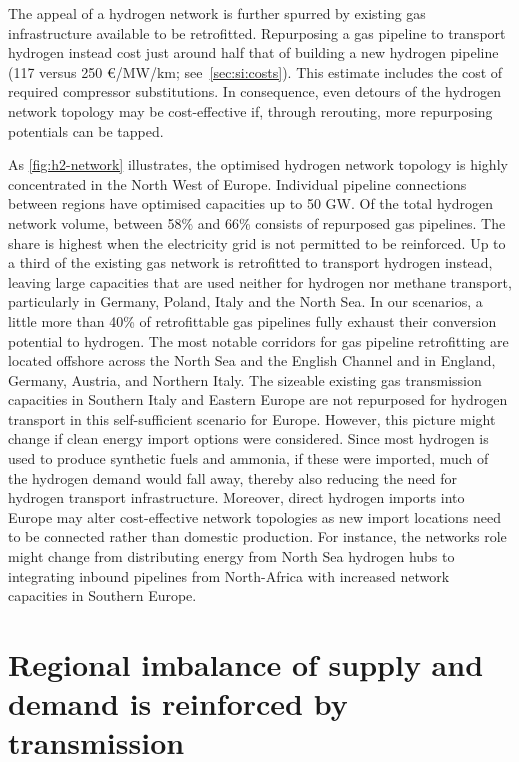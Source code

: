 The appeal of a hydrogen network is further spurred by existing gas
infrastructure available to be retrofitted. Repurposing a gas pipeline to
transport hydrogen instead cost just around half that of building a new
hydrogen pipeline (117 versus 250 \euro/MW/km; see~\cref{sec:si:costs}). This estimate includes
the cost of required compressor substitutions. In consequence, even detours of
the hydrogen network topology may be cost-effective if, through rerouting, more
repurposing potentials can be tapped.

As \cref{fig:h2-network} illustrates, the optimised hydrogen network topology is
highly concentrated in the North West of Europe. Individual pipeline connections
between regions have optimised capacities up to 50 GW. Of the total hydrogen
network volume, between 58\% and 66\% consists of repurposed gas pipelines. The
share is highest when the electricity grid is not permitted to be reinforced. Up
to a third of the existing gas network is retrofitted to transport hydrogen
instead, leaving large capacities that are used neither for hydrogen nor methane
transport, particularly in Germany, Poland, Italy and the North Sea. In our
scenarios, a little more than 40\% of retrofittable gas pipelines fully exhaust
their conversion potential to hydrogen. The most notable corridors for gas
pipeline retrofitting are located offshore across the North Sea and the English
Channel and in England, Germany, Austria, and Northern Italy. The sizeable
existing gas transmission capacities in Southern Italy and Eastern Europe are
not repurposed for hydrogen transport in this self-sufficient scenario for
Europe. However, this picture might change if clean energy import options were
considered. Since most hydrogen is used to produce synthetic fuels and ammonia,
if these were imported, much of the hydrogen demand would fall away, thereby
also reducing the need for hydrogen transport infrastructure. Moreover, direct
hydrogen imports into Europe may alter cost-effective network topologies as new
import locations need to be connected rather than domestic production. For
instance, the networks role might change from distributing energy from North Sea
hydrogen hubs to integrating inbound pipelines from North-Africa with increased
network capacities in Southern Europe.



\section*{Regional imbalance of supply and demand is reinforced by transmission}
\label{sec:imbalance}

